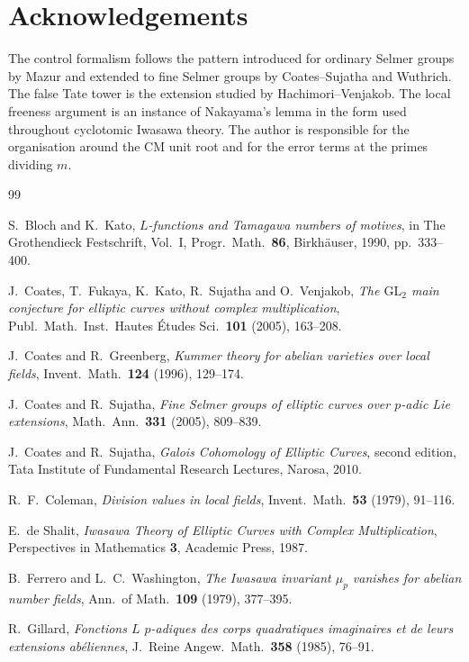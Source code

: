 \documentclass[11pt]{article}
\theoremstyle{definition}
\theoremstyle{remark}
\begin{document}
\section*{Acknowledgements}
The control formalism follows the pattern introduced for ordinary Selmer groups by Mazur and extended to fine Selmer groups by Coates--Sujatha and Wuthrich. The false Tate tower is the extension studied by Hachimori--Venjakob. The local freeness argument is an instance of Nakayama's lemma in the form used throughout cyclotomic Iwasawa theory. The author is responsible for the organisation around the CM unit root and for the error terms at the primes dividing \(m\).

\begin{thebibliography}{99}

S.~Bloch and K.~Kato,
\emph{\(L\)-functions and Tamagawa numbers of motives},
in The Grothendieck Festschrift, Vol.~I,
Progr.\ Math.\ \textbf{86}, Birkh\"auser, 1990, pp.~333--400.

J.~Coates, T.~Fukaya, K.~Kato, R.~Sujatha and O.~Venjakob,
\emph{The \(\mathrm{GL}_2\) main conjecture for elliptic curves without complex multiplication},
Publ.\ Math.\ Inst.\ Hautes \'Etudes Sci.\ \textbf{101} (2005), 163--208.

J.~Coates and R.~Greenberg,
\emph{Kummer theory for abelian varieties over local fields},
Invent.\ Math.\ \textbf{124} (1996), 129--174.

J.~Coates and R.~Sujatha,
\emph{Fine Selmer groups of elliptic curves over \(p\)-adic Lie extensions},
Math.\ Ann.\ \textbf{331} (2005), 809--839.

J.~Coates and R.~Sujatha,
\emph{Galois Cohomology of Elliptic Curves},
second edition, Tata Institute of Fundamental Research Lectures, Narosa, 2010.

R.~F.~Coleman,
\emph{Division values in local fields},
Invent.\ Math.\ \textbf{53} (1979), 91--116.

E.~de Shalit,
\emph{Iwasawa Theory of Elliptic Curves with Complex Multiplication},
Perspectives in Mathematics \textbf{3}, Academic Press, 1987.

B.~Ferrero and L.~C.~Washington,
\emph{The Iwasawa invariant \(\mu_p\) vanishes for abelian number fields},
Ann.\ of Math.\ \textbf{109} (1979), 377--395.

R.~Gillard,
\emph{Fonctions \(L\) \(p\)-adiques des corps quadratiques imaginaires et de leurs extensions ab\'eliennes},
J.\ Reine Angew.\ Math.\ \textbf{358} (1985), 76--91.


\end{thebibliography}
\end{document}
